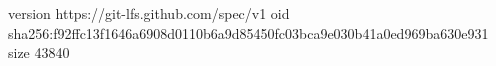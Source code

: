 version https://git-lfs.github.com/spec/v1
oid sha256:f92ffc13f1646a6908d0110b6a9d85450fc03bca9e030b41a0ed969ba630e931
size 43840
